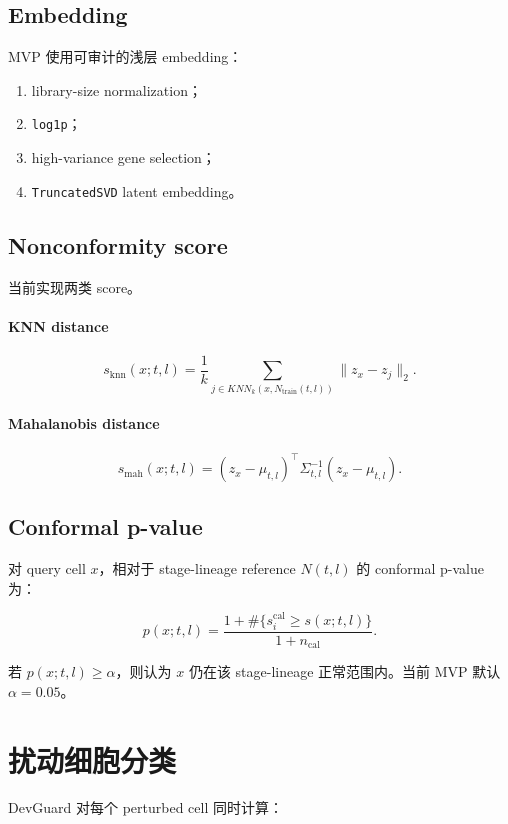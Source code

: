 \documentclass[11pt]{article}
\begin{document}
\subsection*{Embedding}

MVP 使用可审计的浅层 embedding：

\begin{enumerate}
  \item library-size normalization；
  \item \texttt{log1p}；
  \item high-variance gene selection；
  \item \texttt{TruncatedSVD} latent embedding。
\end{enumerate}

\subsection*{Nonconformity score}

当前实现两类 score。

\paragraph{KNN distance}
\[
s_{\mathrm{knn}}(x;t,l)=\frac{1}{k}\sum_{j\in KNN_k(x,N_{\mathrm{train}}(t,l))}\lVert z_x-z_j\rVert_2.
\]

\paragraph{Mahalanobis distance}
\[
s_{\mathrm{mah}}(x;t,l)=(z_x-\mu_{t,l})^\top \Sigma_{t,l}^{-1}(z_x-\mu_{t,l}).
\]

\subsection*{Conformal p-value}

对 query cell \(x\)，相对于 stage-lineage reference \(N(t,l)\) 的 conformal p-value 为：

\[
p(x;t,l)=
\frac{1+\#\{s_i^{\mathrm{cal}}\geq s(x;t,l)\}}
{1+n_{\mathrm{cal}}}.
\]

若 \(p(x;t,l)\geq \alpha\)，则认为 \(x\) 仍在该 stage-lineage 正常范围内。当前 MVP 默认 \(\alpha=0.05\)。

\section*{扰动细胞分类}

DevGuard 对每个 perturbed cell 同时计算：
\end{document}
